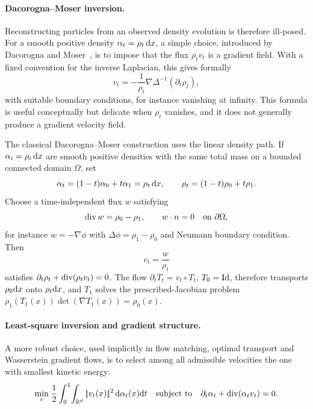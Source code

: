 \paragraph{Dacorogna--Moser inversion.}

Reconstructing particles from an observed density evolution is therefore ill-posed. For a smooth positive density $\alpha_t=\rho_t\,\mathrm{d} x$, a simple choice, introduced by Dacorogna and Moser~\cite{DacorognaMoser1990}, is to impose that the flux $\rho_t v_t$ is a gradient field. With a fixed convention for the inverse Laplacian, this gives formally
\begin{equation}\label{eq:dacorogna-moser}
	v_t=-\frac{1}{\rho_t}\nabla\Delta^{-1}(\partial_t\rho_t),
\end{equation}
with suitable boundary conditions, for instance vanishing at infinity. This formula is useful conceptually but delicate when $\rho_t$ vanishes, and it does not generally produce a gradient velocity field.

The classical Dacorogna--Moser construction uses the linear density path. If $\alpha_i=\rho_i\,\mathrm{d} x$ are smooth positive densities with the same total mass on a bounded connected domain $\Omega$, set
\[
	\alpha_t=(1-t)\alpha_0+t\alpha_1=\rho_t\,\mathrm{d} x,
	\qquad
	\rho_t=(1-t)\rho_0+t\rho_1.
\]
Choose a time-independent flux $w$ satisfying
\[
	\operatorname{div} w=\rho_0-\rho_1,
	\qquad
	w\cdot n=0\quad\hbox{on }\partial\Omega,
\]
for instance $w=-\nabla\phi$ with $\Delta\phi=\rho_1-\rho_0$ and Neumann boundary condition. Then
\[
	v_t=\frac{w}{\rho_t}
\]
satisfies $\partial_t\rho_t+\operatorname{div}(\rho_t v_t)=0$. The flow
$\partial_t T_t=v_t\circ T_t$, $T_0=\mathrm{Id}$, therefore transports
$\rho_0\mathrm{d} x$ onto $\rho_t\mathrm{d} x$, and $T_1$ solves the prescribed-Jacobian problem
$\rho_1(T_1(x))\det(\nabla T_1(x))=\rho_0(x)$.

\paragraph{Least-square inversion and gradient structure.}

A more robust choice, used implicitly in flow matching, optimal transport and Wasserstein gradient flows, is to select among all admissible velocities the one with smallest kinetic energy:
\begin{equation}\label{eq:least-square-field}
	\underset{v}{\min}\;
	\frac12\int_0^1\!\int_{\mathbb{R}^d}|\!| v_t(x) |\!|^2\,\mathrm{d}\alpha_t(x)\mathrm{d} t
	\quad
	\text{subject to}
	\quad
	\partial_t\alpha_t+\operatorname{div}(\alpha_t v_t)=0.
\end{equation}

